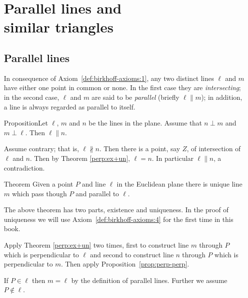 \chapter{Parallel lines and\\ similar triangles}\label{chap:parallel}

\section*{Parallel lines}

In consequence of Axiom~\ref{def:birkhoff-axioms:1}, 
any two distinct lines $\ell$ and $m$ have either one point
in common or none. 
In the first case they are \emph{intersecting}; 
in the second case, $\ell$ and $m$ are said to be \emph{parallel} (briefly $\ell\parallel m$);
in addition, a line is always regarded as parallel to itself.


\begin{thm}{Proposition}\label{prop:perp-perp}Let $\ell$, $m$ and $n$ be the lines in the plane.
Assume that $n\perp m$ and $m\perp \ell$.
Then $\ell\parallel n$. 
\end{thm}

Assume contrary; 
that is, $\ell\nparallel n$.
Then there is a point, say $Z$, of intersection of $\ell$ and $n$.
Then by Theorem \ref{perp:ex+un},
$\ell=n$.
In particular $\ell\parallel n$, a contradiction.
\qeds

\begin{thm}{Theorem}\label{thm:parallel}
Given a point $P$ and line $\ell$ in the Euclidean plane
there is unique line $m$
which pass though $P$ and parallel to $\ell$.
\end{thm}

The above theorem has two parts, existence and uniqueness.
In the proof of uniqueness we will use Axiom~\ref{def:birkhoff-axioms:4} for the first time in this book.

Apply Theorem \ref{perp:ex+un} two times,
first to construct line $m$ through $P$ which is perpendicular to $\ell$
and second to construct line $n$ through $P$ which is perpendicular to $m$.
Then apply Proposition~\ref{prop:perp-perp}.

If $P\in\ell$ then $m=\ell$ by the definition of parallel lines.
Further we assume $P\notin\ell$.

